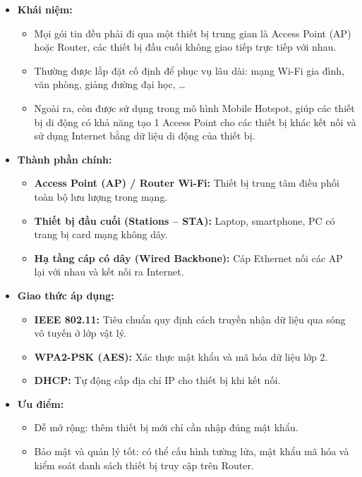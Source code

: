 \begin{itemize}
    \item \textbf{Khái niệm:}
    \begin{itemize}
        \item Mọi gói tin đều phải đi qua một thiết bị trung gian là Access Point (AP) 
        hoặc Router, các thiết bị đầu cuối không giao tiếp trực tiếp với nhau.
        \item Thường được lắp đặt cố định để phục vụ lâu dài: mạng Wi-Fi gia đình, 
        văn phòng, giảng đường đại học, \ldots
        \item Ngoài ra, còn được sử dụng trong mô hình Mobile Hotspot, giúp các thiết bị di
        động có khả năng tạo 1 Access Point cho các thiết bị khác kết nối và sử dụng Internet bằng
        dữ liệu di động của thiết bị.
    \end{itemize}

    \item \textbf{Thành phần chính:}
    \begin{itemize}
        \item \textbf{Access Point (AP) / Router Wi-Fi:} 
        Thiết bị trung tâm điều phối toàn bộ lưu lượng trong mạng.
        \item \textbf{Thiết bị đầu cuối (Stations -- STA):} 
        Laptop, smartphone, PC có trang bị card mạng không dây.
        \item \textbf{Hạ tầng cáp có dây (Wired Backbone):} 
        Cáp Ethernet nối các AP lại với nhau và kết nối ra Internet.
    \end{itemize}

    \item \textbf{Giao thức áp dụng:}
    \begin{itemize}
        \item \textbf{IEEE 802.11:} 
        Tiêu chuẩn quy định cách truyền nhận dữ liệu qua sóng vô tuyến ở lớp vật lý\cite{ieee80211}.
        \item \textbf{WPA2-PSK (AES):} 
        Xác thực mật khẩu và mã hóa dữ liệu lớp 2.
        \item \textbf{DHCP:} 
        Tự động cấp địa chỉ IP cho thiết bị khi kết nối.
    \end{itemize}

    \item \textbf{Ưu điểm\cite{geeksforgeeks2023}:}
    \begin{itemize}
        \item Dễ mở rộng: thêm thiết bị mới chỉ cần nhập đúng mật khẩu.
        \item Bảo mật và quản lý tốt: có thể cấu hình tường lửa, 
        mật khẩu mã hóa và kiểm soát danh sách thiết bị truy cập trên Router.
    \end{itemize}


\end{itemize}
